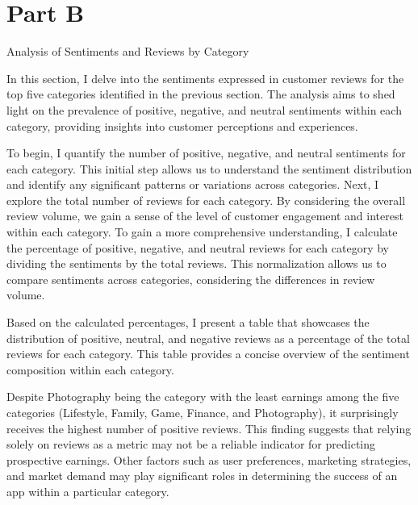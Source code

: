 \documentclass[11pt,preprint, authoryear]{elsarticle}
\numberwithin{equation}{section}
\numberwithin{figure}{section}
\numberwithin{table}{section}
\begin{document}
\hypertarget{part-b}{%
\section{Part B}\label{part-b}}

Analysis of Sentiments and Reviews by Category

In this section, I delve into the sentiments expressed in customer
reviews for the top five categories identified in the previous section.
The analysis aims to shed light on the prevalence of positive, negative,
and neutral sentiments within each category, providing insights into
customer perceptions and experiences.

To begin, I quantify the number of positive, negative, and neutral
sentiments for each category. This initial step allows us to understand
the sentiment distribution and identify any significant patterns or
variations across categories. Next, I explore the total number of
reviews for each category. By considering the overall review volume, we
gain a sense of the level of customer engagement and interest within
each category. To gain a more comprehensive understanding, I calculate
the percentage of positive, negative, and neutral reviews for each
category by dividing the sentiments by the total reviews. This
normalization allows us to compare sentiments across categories,
considering the differences in review volume.

Based on the calculated percentages, I present a table that showcases
the distribution of positive, neutral, and negative reviews as a
percentage of the total reviews for each category. This table provides a
concise overview of the sentiment composition within each category.

Despite Photography being the category with the least earnings among the
five categories (Lifestyle, Family, Game, Finance, and Photography), it
surprisingly receives the highest number of positive reviews. This
finding suggests that relying solely on reviews as a metric may not be a
reliable indicator for predicting prospective earnings. Other factors
such as user preferences, marketing strategies, and market demand may
play significant roles in determining the success of an app within a
particular category.
\end{document}
